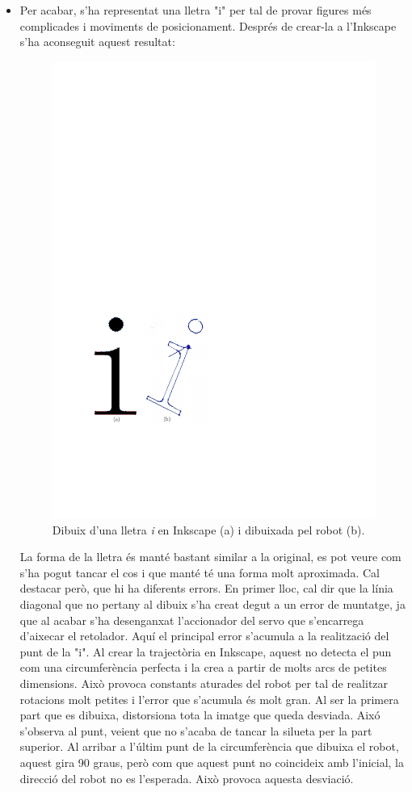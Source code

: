 \begin{itemize}
	\item Per acabar, s'ha representat una lletra "i" per tal de provar figures més complicades i moviments de posicionament. Després de crear-la a l'Inkscape s'ha aconseguit aquest resultat:
	\begin{figure}[H]
		\centering
		\includegraphics{resultatLletra}
		\caption{Dibuix d'una lletra \textit{i} en Inkscape (a) i dibuixada pel robot (b).}
		\label{fig:Lletra}
	\end{figure}
	La forma de la lletra és manté bastant similar a la original, es pot veure com s'ha pogut tancar el cos i que manté té una forma molt aproximada. Cal destacar però, que hi ha diferents errors. En primer lloc, cal dir que la línia diagonal que no pertany al dibuix s'ha creat degut a un error de muntatge, ja que al acabar s'ha desenganxat l'accionador del servo que s'encarrega d'aixecar el retolador. Aquí el principal error s'acumula a la realització del punt de la "i". Al crear la trajectòria en Inkscape, aquest no detecta el pun com una circumferència perfecta i la crea a partir de molts arcs de petites dimensions. Això provoca constants aturades del robot per tal de realitzar rotacions molt petites i l'error que s'acumula és molt gran. Al ser la primera part que es dibuixa, distorsiona tota la imatge que queda desviada. Aixó s'observa al punt, veient que no s'acaba de tancar la silueta per la part superior. Al arribar a l'últim punt de la circumferència que dibuixa el robot, aquest gira 90 graus, però com que aquest punt no coincideix amb l'inicial, la direcció del robot no es l'esperada. Això provoca aquesta desviació. 
	

\end{itemize}
